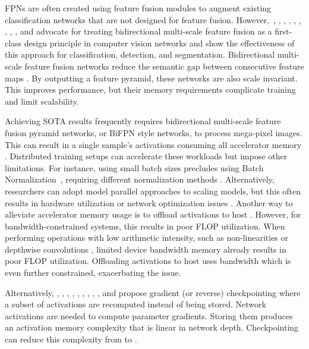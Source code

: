 \documentclass{article}
\begin{document}
FPNs are often created using feature fusion modules to augment existing classification networks that are not designed for feature fusion.
However,~\citet{zhou2015interlinked},
\citet{jacobsen2017multiscale},
\citet{ke2017multigrid},
\citet{huang2018multiscale},
\citet{sun2019hrnet_pose},
\citet{sun2019high_wp},
\citet{wang2020hrnet},
\citet{cheng2020higherhrnet},
\citet{fan2021multiscalevit},
and
\citet{li2021improved}
advocate for treating bidirectional multi-scale feature fusion as a first-class design principle in computer vision networks and show the effectiveness of this approach for classification, detection, and segmentation.
Bidirectional multi-scale feature fusion networks reduce the semantic gap between consecutive feature maps \cite{zhou2018unet}.
By outputting a feature pyramid, these networks are also scale invariant.
This improves performance, but their memory requirements complicate training and limit scalability.

Achieving SOTA results frequently requires bidirectional multi-scale feature fusion pyramid networks, or BiFPN style networks, to process mega-pixel images.
This can result in a single sample's activations consuming all accelerator memory \cite{tao2020hierarchical}.
Distributed training setups can accelerate these workloads but impose other limitations.
For instance, using small batch sizes precludes using Batch Normalization~\cite{ioffe2015batch}, requiring different normalization methods \cite{wu2018group, chiley2019online, rao2020batch, labatie2021proxy}.
Alternatively, researchers can adopt model parallel approaches to scaling models, but this often results in hardware utilization or network optimization issues \cite{huang2019gpipe, chen2018efficient, narayanan2019pipedream, kosson2021pipelined}.
Another way to alleviate accelerator memory usage is to offload activations to host \cite{rajbhandari2021zero}.
However, for bandwidth-constrained systems, this results in poor FLOP utilization.
When performing operations with low arithmetic intensity, such as non-linearities or depthwise convolutions \cite{lu2021optimizing, qin2018diagonalwise}, limited device bandwidth memory already results in poor FLOP utilization.
Offloading activations to host uses bandwidth which is even further constrained, exacerbating the issue.

Alternatively, \citet{volin1985automatic}, \citet{griewank2000algorithm}, \citet{zweig2000exact}, \citet{lewis2003debugging}, \citet{dauvergne2006data}, \citet{griewank2008evaluating}, \citet{gruslys2016memory}, \citet{chen2016training}, \citet{jain2016checkmate}, and \citet{fenghuang2021} 
propose gradient (or reverse) checkpointing where a subset of activations are recomputed instead of being stored.
Network activations are needed to compute parameter gradients.
Storing them produces an activation memory complexity that is linear in network depth.
Checkpointing can reduce this complexity from  to  \cite{chen2016training}.
\end{document}
